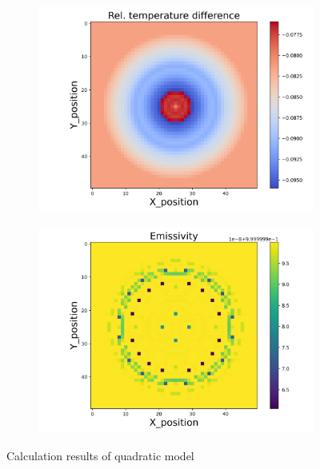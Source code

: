 \begin{figure}[htbp]
\begin{minipage}{\textwidth}
\begin{subfigure}{0.49\textwidth}
        \end{subfigure}
    \end{minipage}\\
    \begin{minipage}{\textwidth}
        \centering
        \begin{subfigure}{0.49\textwidth}
            \centering
            \includegraphics[width=\textwidth]{figures/raw_data/5/quad/T_bias.jpg}
        \end{subfigure}
        \begin{subfigure}{0.49\textwidth}
            \centering
            \includegraphics[width=\textwidth]{figures/raw_data/5/quad/emi_cal.jpg}
        \end{subfigure}
    \end{minipage}
    \caption{Calculation results of quadratic model}
    \label{fig: result_quadratic_model}
\end{figure}

